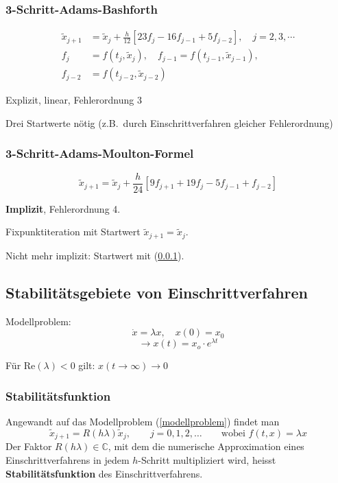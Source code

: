 		\subsubsection{3-Schritt-Adams-Bashforth}
			\label{adamsbash}
			\begin{align*}
				\tilde x_{j+1} &= \tilde x_j + \frac{h}{12}\left[ 23f_j- 16f_{j-1} + 5 f_{j-2}\right], \quad j=2,3,\cdots \\
				f_j &= f(t_j,\tilde x_j), \quad f_{j-1}= f(t_{j-1}, \tilde x_{j-1}), \\
				f_{j-2} &= f(t_{j-2},\tilde x_{j-2})
			\end{align*}
			
			\begin{tightitemize}
				\item Explizit, linear, Fehlerordnung 3
				\item Drei Startwerte nötig (z.B.~durch Einschrittverfahren gleicher Fehlerordnung)
			\end{tightitemize}
			
		\subsubsection{3-Schritt-Adams-Moulton-Formel}
			\[
				\tilde x_{j+1}=\tilde x_j + \frac{h}{24}\left[ 9f_{j+1} + 19 f_j - 5 f_{j-1} + f_{j-2}\right]
			\]
			\begin{tightitemize}
				\item \textbf{Implizit}, Fehlerordnung 4. 
				\item Fixpunktiteration mit Startwert $\tilde x_{j+1}=\tilde x_j$. 
				\item Nicht mehr implizit: Startwert mit (\ref{adamsbash}). 
			\end{tightitemize}
			
	\subsection{Stabilitätsgebiete von Einschrittverfahren}
		Modellproblem: 
		\begin{equation}
			\dot x = \lambda x, \quad x(0)=x_0 \label{modellproblem}
		\end{equation}
		\[
			\rightarrow x(t) = x_o\cdot e^{\lambda t}
		\]
		
		Für $\text{Re}(\lambda) < 0$ gilt: $x(t \to \infty) \to 0$
		
		\subsubsection{Stabilitätsfunktion}
			Angewandt auf das Modellproblem (\ref{modellproblem}) findet man
			\[
				\tilde x_{j+1} = R(h\lambda)\tilde x_j, \qquad j=0,1,2,\dots \qquad \text{wobei } f(t,x) = \lambda x
			\]
			Der Faktor $R(h\lambda) \in \mathbb{C}$, mit dem die numerische Approximation eines Einschrittverfahrens in jedem $h$-Schritt multipliziert wird, heisst \textbf{Stabilitätsfunktion} des Einschrittverfahrens. 
			
